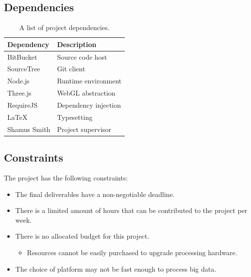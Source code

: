 \documentclass[a4paper]{article}
\begin{document}
{{{			}
		
		}
		
		\subsection{Dependencies} {
		\label{sec:dependencies}
		
			\begin{table}[H]
			\begin{tabularx}{\textwidth}{@{}XX@{}}
				\toprule
				\textbf{Dependency} & \textbf{Description} \\
				\midrule
				BitBucket & Source code host \\
				SourceTree & Git client \\
				Node.js & Runtime environment \\
				Three.js & WebGL abstraction \\
				RequireJS & Dependency injection \\
				LaTeX & Typesetting \\
				Shamus Smith & Project supervisor \\
				\bottomrule
			\end{tabularx}
			\caption{A list of project dependencies.}
			\end{table}
		
		}
		
		\subsection{Constraints} {
		\label{sec:constraints}
		
			The project has the following constraints:
			
			\begin{itemize}
				\item The final deliverables have a non-negotiable deadline.
				\item There is a limited amount of hours that can be contributed to the project per week.
				\item There is no allocated budget for this project.
				\begin{itemize}
					\item Resources cannot be easily purchased to upgrade processing hardware.
				\end{itemize}
				\item The choice of platform may not be fast enough to process big data.
			\end{itemize}
		
}}
\end{document}
